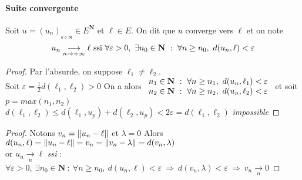 		\vspace{-15pt}
		\traitd 
		\paragraph{Suite convergente}	
			Soit $u=\left( u_n\right)_{_{n\in\mathbf{N}}} \in E^{\mathbf{N}}$ et $\ell\in E$.
			On dit que $u$ converge vers $\ell$ et on note 
			\[
				u_n \underset{n\rightarrow +\infty}{\longrightarrow} \ell ~\mathrm{ssi}~\forall 
				\varepsilon >0 ,~\exists n_0 \in \mathbf{N} ~:~ \forall n\geq n_0,~d(u_n ,\ell) <\varepsilon
			\vspace{-15pt}
			\] 
		\trait 
			
			
		\begin{proof}
			Par l'absurde, on suppose $\ell_1\neq \ell_2$.\\
			Soit $\varepsilon = \frac{1}{2} d(\ell_1,\ell_2) >0$
			On a alors $\begin{array}{l} n_1 \in \mathbf{N} ~:~\forall n\geq n_1 ,~d(u_n,\ell_1) < \varepsilon \\  
			n_2 \in \mathbf{N} ~:~\forall n\geq n_2 ,~d(u_n,\ell_2) < \varepsilon \end{array} $  et soit $p=max(n_1,n_2)$ \vspace*{0.1cm}\\
			$d(\ell_1,\ell_2) \leq d(\ell_1,u_p) + d(\ell_2,u_p) < 2\varepsilon = d(\ell_1,\ell_2)$  \emph{impossible}
		\end{proof} \medskip
		
		
		\begin{proof}
			Notons $v_n = \left\Vert u_n-\ell \right\Vert$ et $\lambda = 0$
			Alors $d(u_n,\ell) = \left\Vert u_n - \ell \right\Vert = v_n = \left\Vert v_n - \lambda \right\Vert = d(v_n,\lambda )$ \\
			or $u_n \underset{n}{\rightarrow} \ell$ \emph{ssi} : $\forall \varepsilon >0 ,~\exists n_0 \in \mathbf{N} ~:~ 
			\forall n\geq n_0,~d(u_n ,\ell) <\varepsilon ~\Rightarrow ~ d(v_n,\lambda)<\varepsilon ~\Rightarrow ~ v_n \underset{n}{\rightarrow} 0$
		\end{proof} \medskip


